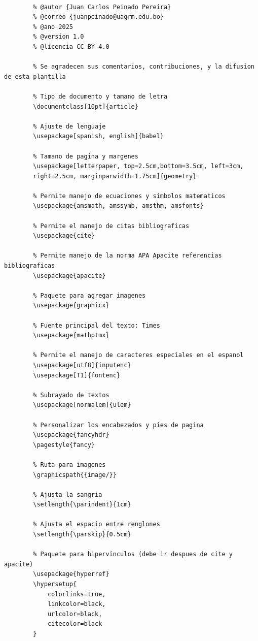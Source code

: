 \documentclass[10pt,twocolumn]{article}
\begin{document}
    \begin{lstlisting}[style=mystyle]
      
        % @autor {Juan Carlos Peinado Pereira}
        % @correo {juanpeinado@uagrm.edu.bo}
        % @ano 2025
        % @version 1.0
        % @licencia CC BY 4.0
    
        % Se agradecen sus comentarios, contribuciones, y la difusion de esta plantilla
        
        % Tipo de documento y tamano de letra
        \documentclass[10pt]{article}
        
        % Ajuste de lenguaje
        \usepackage[spanish, english]{babel}
        
        % Tamano de pagina y margenes
        \usepackage[letterpaper, top=2.5cm,bottom=3.5cm, left=3cm, 
        right=2.5cm, marginparwidth=1.75cm]{geometry}
        
        % Permite manejo de ecuaciones y simbolos matematicos
        \usepackage{amsmath, amssymb, amsthm, amsfonts}
        
        % Permite el manejo de citas bibliograficas
        \usepackage{cite}
        
        % Permite manejo de la norma APA Apacite referencias bibliograficas
        \usepackage{apacite}
        
        % Paquete para agregar imagenes
        \usepackage{graphicx}
        
        % Fuente principal del texto: Times
        \usepackage{mathptmx}
        
        % Permite el manejo de caracteres especiales en el espanol
        \usepackage[utf8]{inputenc} 
        \usepackage[T1]{fontenc}
        
        % Subrayado de textos
        \usepackage[normalem]{ulem}
        
        % Personalizar los encabezados y pies de pagina
        \usepackage{fancyhdr}
        \pagestyle{fancy}
        
        % Ruta para imagenes
        \graphicspath{{image/}}
        
        % Ajusta la sangria
        \setlength{\parindent}{1cm}
        
        % Ajusta el espacio entre renglones
        \setlength{\parskip}{0.5cm}
        
        % Paquete para hipervinculos (debe ir despues de cite y apacite)
        \usepackage{hyperref}
        \hypersetup{
            colorlinks=true,
            linkcolor=black,
            urlcolor=black,
            citecolor=black
        }
        

\end{lstlisting}
\end{document}
